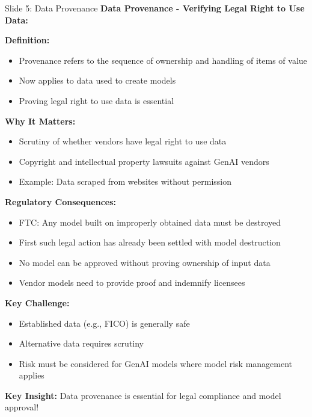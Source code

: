 \documentclass[8pt]{beamer}
\begin{document}
	\begin{frame}{Slide 5: Data Provenance}
		\fontsize{6.5}{7.5}\selectfont
		\textbf{Data Provenance - Verifying Legal Right to Use Data:}
		
		\vspace{0.1cm}
		\textbf{Definition:}
		\begin{itemize}
			\item Provenance refers to the sequence of ownership and handling of items of value
			\item Now applies to data used to create models
			\item Proving legal right to use data is essential
		\end{itemize}
		
		\vspace{0.1cm}
		\textbf{Why It Matters:}
		\begin{itemize}
			\item Scrutiny of whether vendors have legal right to use data
			\item Copyright and intellectual property lawsuits against GenAI vendors
			\item Example: Data scraped from websites without permission
		\end{itemize}
		
		\vspace{0.1cm}
		\textbf{Regulatory Consequences:}
		\begin{itemize}
			\item FTC: Any model built on improperly obtained data must be destroyed
			\item First such legal action has already been settled with model destruction
			\item No model can be approved without proving ownership of input data
			\item Vendor models need to provide proof and indemnify licensees
		\end{itemize}
		
		\vspace{0.1cm}
		\textbf{Key Challenge:}
		\begin{itemize}
			\item Established data (e.g., FICO) is generally safe
			\item Alternative data requires scrutiny
			\item Risk must be considered for GenAI models where model risk management applies
		\end{itemize}
		
		\textcolor{myblue}{\textbf{Key Insight:}} Data provenance is \textcolor{myblue}{essential for legal compliance and model approval}!
	\end{frame}
	
\end{document}
